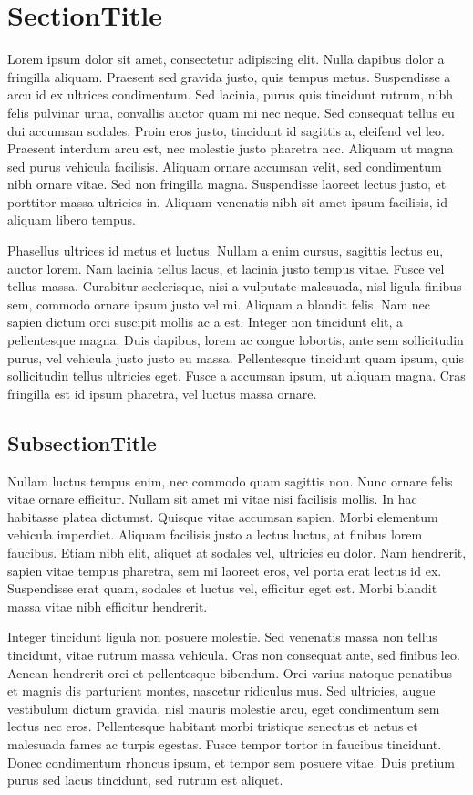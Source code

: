 \section{SectionTitle}
Lorem ipsum dolor sit amet, consectetur adipiscing elit. Nulla dapibus dolor a fringilla aliquam. Praesent sed gravida justo, quis tempus metus. Suspendisse a arcu id ex ultrices condimentum. Sed lacinia, purus quis tincidunt rutrum, nibh felis pulvinar urna, convallis auctor quam mi nec neque. Sed consequat tellus eu dui accumsan sodales. Proin eros justo, tincidunt id sagittis a, eleifend vel leo. Praesent interdum arcu est, nec molestie justo pharetra nec. Aliquam ut magna sed purus vehicula facilisis. Aliquam ornare accumsan velit, sed condimentum nibh ornare vitae. Sed non fringilla magna. Suspendisse laoreet lectus justo, et porttitor massa ultricies in. Aliquam venenatis nibh sit amet ipsum facilisis, id aliquam libero tempus.

Phasellus ultrices id metus et luctus. Nullam a enim cursus, sagittis lectus eu, auctor lorem. Nam lacinia tellus lacus, et lacinia justo tempus vitae. Fusce vel tellus massa. Curabitur scelerisque, nisi a vulputate malesuada, nisl ligula finibus sem, commodo ornare ipsum justo vel mi. Aliquam a blandit felis. Nam nec sapien dictum orci suscipit mollis ac a est. Integer non tincidunt elit, a pellentesque magna. Duis dapibus, lorem ac congue lobortis, ante sem sollicitudin purus, vel vehicula justo justo eu massa. Pellentesque tincidunt quam ipsum, quis sollicitudin tellus ultricies eget. Fusce a accumsan ipsum, ut aliquam magna. Cras fringilla est id ipsum pharetra, vel luctus massa ornare.

\subsection{SubsectionTitle}
Nullam luctus tempus enim, nec commodo quam sagittis non. Nunc ornare felis vitae ornare efficitur. Nullam sit amet mi vitae nisi facilisis mollis. In hac habitasse platea dictumst. Quisque vitae accumsan sapien. Morbi elementum vehicula imperdiet. Aliquam facilisis justo a lectus luctus, at finibus lorem faucibus. Etiam nibh elit, aliquet at sodales vel, ultricies eu dolor. Nam hendrerit, sapien vitae tempus pharetra, sem mi laoreet eros, vel porta erat lectus id ex. Suspendisse erat quam, sodales et luctus vel, efficitur eget est. Morbi blandit massa vitae nibh efficitur hendrerit.

Integer tincidunt ligula non posuere molestie. Sed venenatis massa non tellus tincidunt, vitae rutrum massa vehicula. Cras non consequat ante, sed finibus leo. Aenean hendrerit orci et pellentesque bibendum. Orci varius natoque penatibus et magnis dis parturient montes, nascetur ridiculus mus. Sed ultricies, augue vestibulum dictum gravida, nisl mauris molestie arcu, eget condimentum sem lectus nec eros. Pellentesque habitant morbi tristique senectus et netus et malesuada fames ac turpis egestas. Fusce tempor tortor in faucibus tincidunt. Donec condimentum rhoncus ipsum, et tempor sem posuere vitae. Duis pretium purus sed lacus tincidunt, sed rutrum est aliquet.

